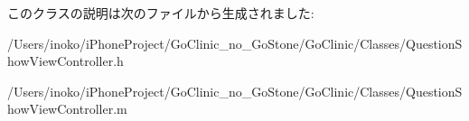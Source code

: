 このクラスの説明は次のファイルから生成されました:\begin{DoxyCompactItemize}
\item 
/Users/inoko/iPhoneProject/GoClinic\_\-no\_\-GoStone/GoClinic/Classes/QuestionShowViewController.h\item 
/Users/inoko/iPhoneProject/GoClinic\_\-no\_\-GoStone/GoClinic/Classes/QuestionShowViewController.m\end{DoxyCompactItemize}
